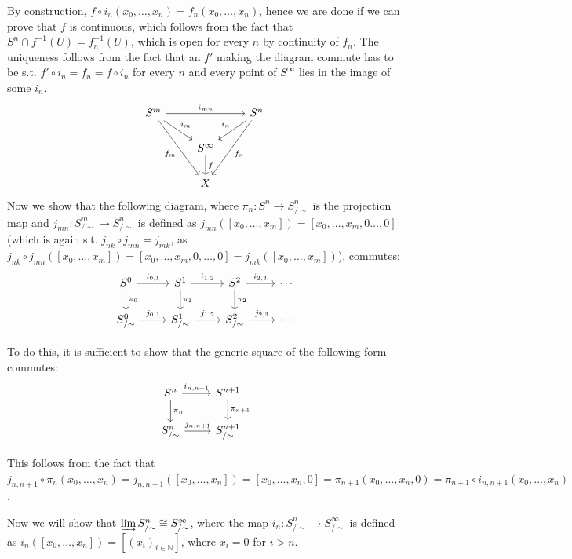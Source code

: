 \documentclass{article}
\newcommand{\numberset}{\mathbb}
\newcommand{\N}{\numberset{N}}
\begin{document}
By construction, $f\circ i_n(x_0,\ldots,x_n)=f_n(x_0,\ldots,x_n)$, hence we are done if we can prove that $f$ is continuous, which follows from the fact that $S^n\cap f^{-1}(U)=f^{-1}_n(U)$, which is open for every $n$ by continuity of $f_n$. The uniqueness follows from the fact that an $f'$ making the diagram commute has to be s.t. $f'\circ i_n=f_n=f\circ i_n$ for every $n$ and every point of $S^{\infty}$ lies in the image of some $i_n$.
\[
  \begin{tikzcd}
    S^m\arrow{rr}{i_{mn}}\arrow{dr}{i_m}\arrow[swap]{ddr}{f_m} & & S^n\arrow[swap]{dl}{i_n}\arrow{ddl}{f_n} \\
    & S^{\infty}\arrow{d}{f} \\
    & X
  \end{tikzcd}
\]
Now we show that the following diagram, where $\pi_n:S^n\rightarrow S^n_{/\sim}$ is the projection map and $j_{mn}:S^m_{/\sim}\rightarrow S^n_{/\sim}$ is defined as $j_{mn}([x_0,\ldots,x_m])=[x_0,\ldots,x_m,0\ldots,0]$ (which is again s.t. $j_{nk}\circ j_{mn}=j_{mk}$, as $j_{nk}\circ j_{mn}([x_0,\ldots,x_m])=[x_0,\ldots,x_m,0,\ldots,0]=j_{mk}([x_0,\ldots,x_m])$), commutes:
\[
  \begin{tikzcd}
    S^0\arrow{d}{\pi_0}\arrow{r}{i_{0,1}} & S^1\arrow{d}{\pi_1}\arrow{r}{i_{1,2}} & S^2\arrow{d}{\pi_2}\arrow{r}{i_{2,3}} & \cdots \\
    S^0_{/\sim}\arrow{r}{j_{0,1}} & S^1_{/\sim}\arrow{r}{j_{1,2}} & S^2_{/\sim}\arrow{r}{j_{2,3}} & \cdots
  \end{tikzcd}
\]

To do this, it is sufficient to show that the generic square of the following form commutes:
\[
  \begin{tikzcd}
    S^n\arrow{d}{\pi_n}\arrow{r}{i_{n,n+1}} & S^{n+1}\arrow{d}{\pi_{n+1}} \\
    S^n_{/\sim}\arrow{r}{j_{n,n+1}} & S^{n+1}_{/\sim}
  \end{tikzcd}
\]

This follows from the fact that $j_{n,n+1}\circ\pi_n(x_0,\ldots,x_n)=j_{n,n+1}([x_0,\ldots,x_n])=[x_0,\ldots,x_n,0]=\pi_{n+1}(x_0,\ldots,x_n,0)=\pi_{n+1}\circ i_{n,n+1}(x_0,\ldots,x_n)$.

Now we will show that $\varinjlim S^n_{/\sim}\cong S^{\infty}_{/\sim}$, where the map $i_n:S^n_{/\sim}\rightarrow S^{\infty}_{/\sim}$ is defined as $i_n([x_0,\ldots,x_n])=[(x_i)_{i\in\N}]$, where $x_i=0$ for $i>n$.
\end{document}
